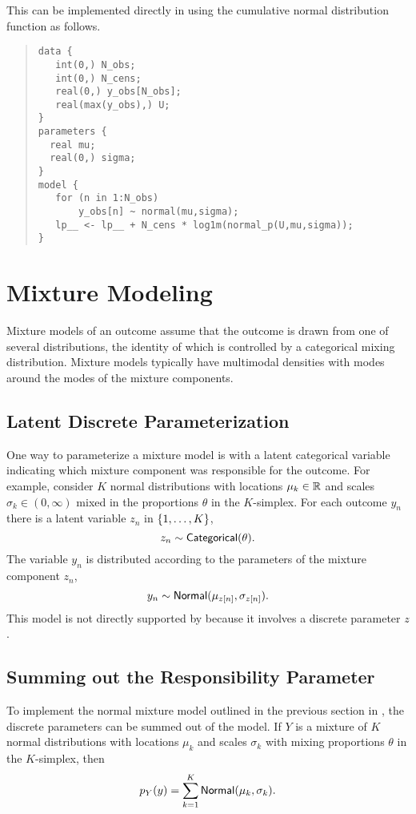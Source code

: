 % 
This can be implemented directly in \Stan using the cumulative normal
distribution function  as follows.
%
\begin{quote}
\begin{Verbatim}
data {
   int(0,) N_obs;
   int(0,) N_cens;
   real(0,) y_obs[N_obs];
   real(max(y_obs),) U;
}
parameters {
  real mu;
  real(0,) sigma;
}
model {
   for (n in 1:N_obs)
       y_obs[n] ~ normal(mu,sigma);
   lp__ <- lp__ + N_cens * log1m(normal_p(U,mu,sigma));
}
\end{Verbatim}
\end{quote}








\chapter{Mixture Modeling}

Mixture models of an outcome assume that the outcome is drawn from one
of several distributions, the identity of which is controlled by a
categorical mixing distribution.  Mixture models typically have
multimodal densities with modes around the modes of the mixture
components.  

\section{Latent Discrete Parameterization}

One way to parameterize a mixture model is with a latent categorical
variable indicating which mixture component was responsible for the
outcome. For example, consider $K$ normal distributions with locations
$\mu_k \in \mathbb{R}$ and scales $\sigma_k \in (0,\infty)$ mixed in the
proportions $\theta$ in the $K$-simplex.  For each outcome $y_n$ there
is a latent variable $z_n$ in $\{ 1,\ldots,K \}$,
%
\[
z_n \sim \mbox{\sf Categorical}(\theta).
\]
%
The variable $y_n$ is distributed according to the parameters
of the mixture component $z_n$, 
\[
y_n \sim \mbox{\sf Normal}(\mu_{z[n]},\sigma_{z[n]}).
\]
%
This model is not directly supported by \Stan because it involves a
discrete parameter $z$.  

\section{Summing out the Responsibility Parameter}

To implement the normal mixture model outlined in the previous
section in \Stan, the discrete parameters can be summed out of the
model. If $Y$ is a mixture of $K$ normal distributions with 
locations $\mu_k$ and scales $\sigma_k$ with mixing proportions
$\theta$ in the $K$-simplex, then 
\[
p_Y(y) = \sum_{k=1}^K \mbox{\sf Normal}(\mu_k,\sigma_k).
\]

